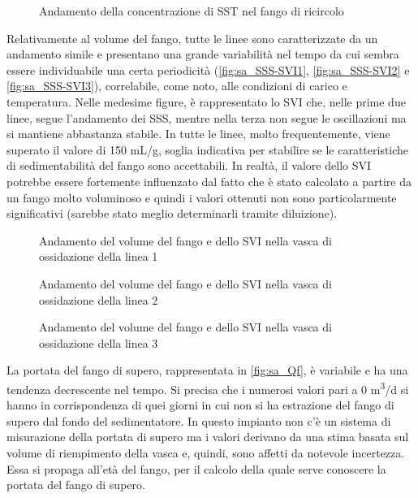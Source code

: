 \begin{figure}[H]
		\centering
	\caption{Andamento della concentrazione di SST nel fango di ricircolo}
	\label{fig:sa_SSTric}
\end{figure}

Relativamente al volume del fango, tutte le linee sono caratterizzate da un andamento simile e presentano una grande variabilità nel tempo da cui sembra essere individuabile una certa periodicità (\autoref{fig:sa_SSS-SVI1}, \autoref{fig:sa_SSS-SVI2} e \autoref{fig:sa_SSS-SVI3}), correlabile, come noto, alle condizioni di carico e temperatura. 
Nelle medesime figure, è rappresentato lo SVI che, nelle prime due linee, segue l'andamento dei SSS, mentre nella terza non segue le oscillazioni ma si mantiene abbastanza stabile. In tutte le linee, molto frequentemente, viene superato il valore di 150 mL/g, soglia indicativa per stabilire se le caratteristiche di sedimentabilità del fango sono accettabili. In realtà, il valore dello SVI potrebbe essere fortemente influenzato dal fatto che è stato calcolato a partire da un fango molto voluminoso e quindi i valori ottenuti non sono particolarmente significativi (sarebbe stato meglio determinarli tramite diluizione).

\begin{figure}[H]
		\centering
	\caption{Andamento del volume del fango e dello SVI nella vasca di ossidazione della linea 1}
	\label{fig:sa_SSS-SVI1}
\end{figure}
\begin{figure}[H]
		\centering
	\caption{Andamento del volume del fango e dello SVI nella vasca di ossidazione della linea 2}
	\label{fig:sa_SSS-SVI2}
\end{figure}
\begin{figure}[H]
		\centering
	\caption{Andamento del volume del fango e dello SVI nella vasca di ossidazione della linea 3}
	\label{fig:sa_SSS-SVI3}
\end{figure}

La portata del fango di supero, rappresentata in \autoref{fig:sa_Qf}, è variabile e ha una tendenza decrescente nel tempo. Si precisa che i numerosi valori pari a 0 m\textsuperscript{3}/d si hanno in corrispondenza di quei giorni in cui non si ha estrazione del fango di supero dal fondo del sedimentatore. In questo impianto non c'è un sistema di misurazione della portata di supero ma i valori derivano da una stima basata sul volume di riempimento della vasca e, quindi, sono affetti da notevole incertezza. Essa si propaga all'età del fango, per il calcolo della quale serve conoscere la portata del fango di supero.

